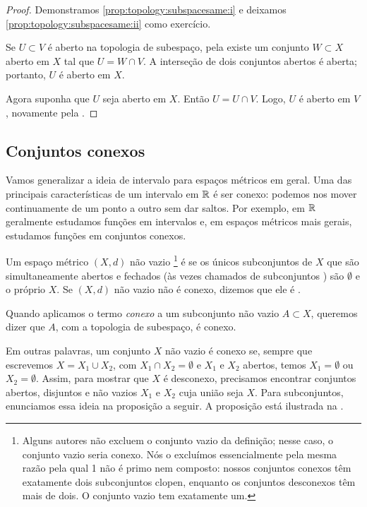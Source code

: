 \begin{proof}
Demonstramos
\ref{prop:topology:subspacesame:i}
e deixamos
\ref{prop:topology:subspacesame:ii} como exercício.

Se $U \subset V$ é aberto na topologia de subespaço, pela
 existe um conjunto $W \subset X$ aberto
em $X$ tal que $U = W \cap V$. A interseção de dois conjuntos abertos é
aberta; portanto, $U$ é aberto em $X$.

Agora suponha que $U$ seja aberto em $X$. Então $U = U \cap V$. Logo,
$U$ é aberto em $V$, novamente pela .
\end{proof}

\subsection{Conjuntos conexos}

Vamos generalizar a ideia de intervalo para espaços métricos em geral. Uma
das principais características de um intervalo em ${\mathbb{R}}$ é ser conexo: podemos
nos mover continuamente de um ponto a outro sem dar saltos.
Por exemplo, em ${\mathbb{R}}$ geralmente estudamos funções em intervalos e, em espaços
métricos mais gerais, estudamos funções em conjuntos conexos.

\begin{defn}
Um espaço métrico $(X,d)$ não vazio%
\footnote{Alguns autores não excluem o conjunto vazio da definição; nesse
caso, o conjunto vazio seria conexo.
Nós o excluímos essencialmente pela mesma razão pela qual 1 não é primo nem
composto: nossos conjuntos conexos têm exatamente dois subconjuntos clopen,
enquanto os conjuntos desconexos têm mais de dois. O conjunto vazio tem
exatamente um.}
é \emph{} se os únicos subconjuntos de $X$ que são
simultaneamente abertos e fechados (às vezes chamados de subconjuntos
\emph{}) são $\emptyset$ e o próprio $X$.
Se $(X,d)$ não vazio não é conexo, dizemos que ele é
\emph{}.

Quando aplicamos o termo \emph{conexo} a um subconjunto não vazio $A \subset X$,
queremos dizer que $A$, com a topologia de subespaço, é conexo.
\end{defn}

Em outras palavras, um conjunto $X$ não vazio é conexo se, sempre que
escrevemos $X = X_1 \cup X_2$, com $X_1 \cap X_2 = \emptyset$ e $X_1$ e
$X_2$ abertos, temos $X_1 = \emptyset$ ou $X_2 = \emptyset$.
Assim, para mostrar que $X$ é desconexo, precisamos encontrar conjuntos
abertos, disjuntos e não vazios $X_1$ e $X_2$ cuja união seja $X$.
Para subconjuntos, enunciamos essa ideia na proposição a seguir.
A proposição está ilustrada na .

